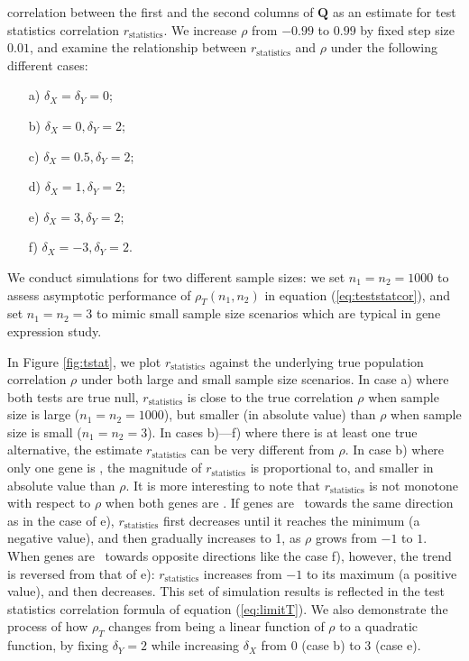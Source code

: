 correlation between the first and the second columns of $\bm Q$ as an estimate for test 
statistics correlation	$r_\text{statistics}$. 
We increase $\rho$ from $-0.99$ to $0.99$ by fixed step size $0.01$, and examine the 
relationship between $r_\text{statistics}$ and $\rho$ under the following different cases:
\begin{enumerate}
	\item[a)]  $\delta_X = \delta_Y  =0$;
	\item[b)]  $\delta_X = 0, \delta_Y=2$;
	\item[c)]  $\delta_X = 0.5, \delta_Y=2$;
	\item[d)]  $\delta_X = 1, \delta_Y=2$;
	\item[e)]  $\delta_X = 3, \delta_Y=2$;
	\item[f)]  $\delta_X = -3, \delta_Y=2$.
\end{enumerate}

We conduct simulations for two different sample sizes: we set $n_1 = n_2 = 1000$ to assess 
asymptotic performance of $\rho_T(n_1,n_2)$ in equation (\ref{eq:teststatcor}), and set $n_1 = n_2 
= 3$ to mimic small sample size scenarios which are typical in gene expression study. 

In Figure \ref{fig:tstat}, we plot $r_\text{statistics}$ against the 
underlying true population correlation $\rho$ under both large and small sample size scenarios. 
In case a) where both tests are true null, $r_\text{statistics}$ is close to the true 
correlation $\rho$ when sample size is large ($n_1 = n_2 = 1000$), but smaller (in absolute 
value) than $\rho$ when sample size is small ($n_1 = n_2 = 3$).
In cases b)---f) where there is at least one true alternative, the estimate
$r_\text{statistics}$ can be very 
different from $\rho$. In case b) where only one gene is \DED, 
the magnitude of $r_\text{statistics}$ is proportional to, and smaller in absolute value than 
$\rho$.
It is more interesting to note that $r_\text{statistics}$ is not monotone with respect to 
$\rho$ when both genes are \DED. If genes are \DED~towards the same direction as in the case of 
e),  $r_\text{statistics}$ first decreases until it reaches the minimum (a negative value), and 
then gradually increases to 1, as 
$\rho$ grows from $-1$ to $1$. When genes are \DED~towards opposite directions like the case f), 
however, the trend is reversed from that of e): $r_\text{statistics}$ increases from $-1$ to 
its maximum (a positive value), and then decreases. 
This set of simulation results is reflected in the test statistics correlation formula of 
equation (\ref{eq:limitT}). We also demonstrate the process of how $\rho_T$ changes from
being a linear function of $\rho$ to a quadratic function, by fixing $\delta_Y=2$ while 
increasing $\delta_X$ from $0$ (case b) to $3$ (case e).


